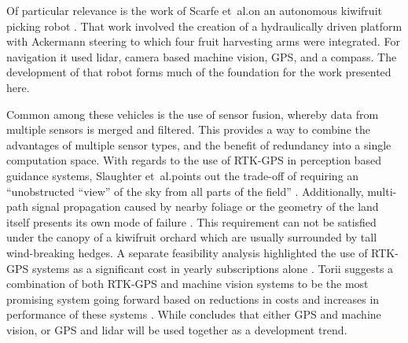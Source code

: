 \documentclass[preprint,authoryear,12pt]{elsarticle}
\begin{document}
    Of particular relevance is the work of Scarfe et~al.\@ on an autonomous kiwifruit picking robot \citep{scarfe2009, Scarfe2012}.
    That work involved the creation of a hydraulically driven platform with Ackermann steering to which four fruit harvesting arms were integrated.
    For navigation it used lidar, camera based machine vision, GPS, and a compass.
    The development of that robot forms much of the foundation for the work presented here.

    Common among these vehicles is the use of sensor fusion, whereby data from multiple sensors is merged and filtered.
    This provides a way to combine the advantages of multiple sensor types, and the benefit of redundancy  into a single computation space.
    With regards to the use of RTK-GPS in perception based guidance systems, Slaughter et~al.\@ points out the trade-off of requiring an ``unobstructed ``view'' of the sky from all parts of the field'' \citep{Slaughter2008}.
    Additionally, multi-path signal propagation caused by nearby foliage or the geometry of the land itself presents its own mode of failure \citep{Durrant-Whyte2005}.
    This requirement can not be satisfied under the canopy of a kiwifruit orchard which are usually surrounded by tall wind-breaking hedges.
    A separate feasibility analysis highlighted the use of RTK-GPS systems as a significant cost in yearly subscriptions alone \citep{Pedersen2006}.
    Torii suggests a combination of both RTK-GPS and machine vision systems to be the most promising system going forward based on reductions in costs and increases in performance of these systems \cite{Torii2000}.
    While \cite{Li2009} concludes that either GPS and machine vision, or GPS and lidar will be used together as a development trend.



\end{document}
